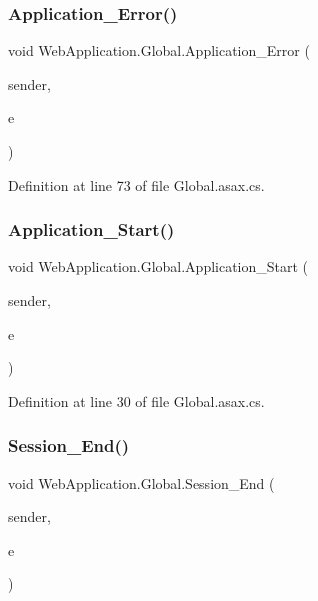 \subsubsection{\texorpdfstring{Application\_Error()}{Application\_Error()}}
{\footnotesize\ttfamily void Web\+Application.\+Global.\+Application\+\_\+\+Error (\begin{DoxyParamCaption}\item[{object}]{sender,  }\item[{Event\+Args}]{e }\end{DoxyParamCaption})\hspace{0.3cm}{\ttfamily [protected]}}



Definition at line 73 of file Global.\+asax.\+cs.

\mbox{\label{classWebApplication_1_1Global_a138ffd46dafd12c3e22b7bc70c4e4238}} 
\subsubsection{\texorpdfstring{Application\_Start()}{Application\_Start()}}
{\footnotesize\ttfamily void Web\+Application.\+Global.\+Application\+\_\+\+Start (\begin{DoxyParamCaption}\item[{object}]{sender,  }\item[{Event\+Args}]{e }\end{DoxyParamCaption})\hspace{0.3cm}{\ttfamily [protected]}}



Definition at line 30 of file Global.\+asax.\+cs.

\mbox{\label{classWebApplication_1_1Global_ac730b53f2e5ac5b5981b2aabd4cdad1a}} 
\subsubsection{\texorpdfstring{Session\_End()}{Session\_End()}}
{\footnotesize\ttfamily void Web\+Application.\+Global.\+Session\+\_\+\+End (\begin{DoxyParamCaption}\item[{object}]{sender,  }\item[{Event\+Args}]{e }\end{DoxyParamCaption})\hspace{0.3cm}{\ttfamily [protected]}}



